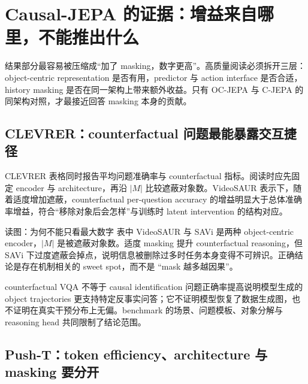 \section{Causal-JEPA 的证据：增益来自哪里，不能推出什么}

结果部分最容易被压缩成``加了 masking，数字更高''。高质量阅读必须拆开三层：object-centric representation 是否有用，predictor 与 action interface 是否合适，history masking 是否在同一架构上带来额外收益。只有 OC-JEPA 与 C-JEPA 的同架构对照，才最接近回答 masking 本身的贡献。

\subsection{CLEVRER：counterfactual 问题最能暴露交互捷径}

CLEVRER 表格同时报告平均问题准确率与 counterfactual 指标。阅读时应先固定 encoder 与 architecture，再沿 $|M|$ 比较遮蔽对象数。VideoSAUR 表示下，随着适度增加遮蔽，counterfactual per-question accuracy 的增益明显大于总体准确率增益，符合``移除对象后会怎样''与训练时 latent intervention 的结构对应。



\begin{knowledgebox}{读图：为何不能只看最大数字}
表中 VideoSAUR 与 SAVi 是两种 object-centric encoder，$|M|$ 是被遮蔽对象数。适度 masking 提升 counterfactual reasoning，但 SAVi 下过度遮蔽会掉点，说明信息被删除过多时任务本身变得不可辨识。正确结论是存在机制相关的 sweet spot，而不是 ``mask 越多越因果''。
\end{knowledgebox}

\begin{warningbox}{counterfactual VQA 不等于 causal identification}
问题正确率提高说明模型生成的 object trajectories 更支持特定反事实问答；它不证明模型恢复了数据生成图，也不证明在真实干预分布上无偏。benchmark 的场景、问题模板、对象分解与 reasoning head 共同限制了结论范围。
\end{warningbox}

\subsection{Push-T：token efficiency、architecture 与 masking 要分开}

